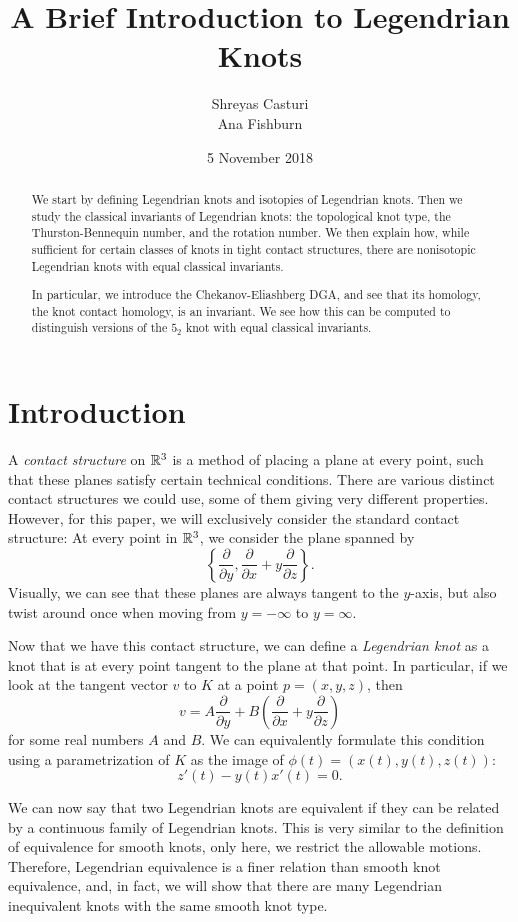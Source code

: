 \documentclass{article}
\title{A Brief Introduction to Legendrian Knots}
\author{Shreyas Casturi\\Ana Fishburn}
\date{5 November 2018}
\begin{document}
\maketitle

\begin{abstract}
We start by defining Legendrian knots and isotopies of Legendrian knots.
Then we study the classical invariants of Legendrian knots:
the topological knot type, the Thurston-Bennequin number, and the rotation number.
We then explain how, while sufficient for certain classes of knots in tight
contact structures, there are nonisotopic Legendrian knots with equal
classical invariants.

In particular, we introduce the Chekanov-Eliashberg DGA, and see that its
homology, the knot contact homology, is an invariant. We see how this
can be computed to distinguish versions of the $5_2$ knot with equal classical
invariants.
\end{abstract}

\section{Introduction}
A {\it contact structure} on $\mathbb{R}^3$ is a method of placing a plane at every point,
such that these planes satisfy certain technical conditions.
There are various distinct contact structures we could use, some of them giving
very different properties.
However, for this paper, we will exclusively consider the standard contact structure:
At every point in $\mathbb{R}^3$, we consider the plane spanned by
\[\left\{\frac{\partial}{\partial y},\frac{\partial}{\partial x} + y\frac{\partial}{\partial z}\right\}.\]
Visually, we can see that these planes are always tangent to the $y$-axis, but also
twist around once when moving from $y = -\infty$ to $y = \infty$.

Now that we have this contact structure, we can define a {\it Legendrian knot}
as a knot that is at every point tangent to the plane at that point.
In particular, if we look at the tangent vector $v$ to $K$ at a point $p = (x,y,z)$,
then
\[ v = A\frac{\partial}{\partial y} + B\left(\frac{\partial}{\partial x} +y\frac{\partial}{\partial z}\right)\]
for some real numbers $A$ and $B$.
We can equivalently formulate this condition using a parametrization of $K$ as
the image of $\phi(t) = (x(t),y(t),z(t))$:
\[ z'(t)-y(t)x'(t) = 0.\]

We can now say that two Legendrian knots are equivalent if they can be related by a continuous
family of Legendrian knots. This is very similar to the definition of equivalence
for smooth knots, only here, we restrict the allowable motions.
Therefore, Legendrian equivalence is a finer relation than smooth knot equivalence,
and, in fact, we will show that there are many Legendrian inequivalent knots
with the same smooth knot type.
\end{document}
